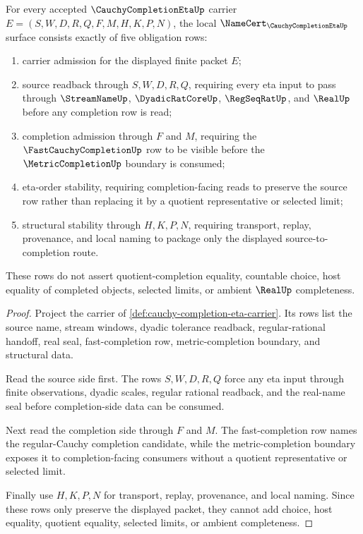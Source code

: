\begin{theorem}
\label{thm:cauchy-completion-eta-namecert-obligations}
For every accepted $\CauchyCompletionEtaUp$ carrier $E=(S,W,D,R,Q,F,M,H,K,P,N)$, the local $\NameCert_{\CauchyCompletionEtaUp}$ surface consists exactly of five obligation rows:
\begin{enumerate}
\item carrier admission for the displayed finite packet $E$;
\item source readback through $S,W,D,R,Q$, requiring every eta input to pass through $\StreamNameUp$, $\DyadicRatCoreUp$, $\RegSeqRatUp$, and $\RealUp$ before any completion row is read;
\item completion admission through $F$ and $M$, requiring the $\FastCauchyCompletionUp$ row to be visible before the $\MetricCompletionUp$ boundary is consumed;
\item eta-order stability, requiring completion-facing reads to preserve the source row rather than replacing it by a quotient representative or selected limit;
\item structural stability through $H,K,P,N$, requiring transport, replay, provenance, and local naming to package only the displayed source-to-completion route.
\end{enumerate}
These rows do not assert quotient-completion equality, countable choice, host equality of completed objects, selected limits, or ambient $\RealUp$ completeness.
\end{theorem}
\begin{proof}
Project the carrier of \autoref{def:cauchy-completion-eta-carrier}. Its rows list the source name, stream windows, dyadic tolerance readback, regular-rational handoff, real seal, fast-completion row, metric-completion boundary, and structural data.

Read the source side first. The rows $S,W,D,R,Q$ force any eta input through finite observations, dyadic scales, regular rational readback, and the real-name seal before completion-side data can be consumed.

Next read the completion side through $F$ and $M$. The fast-completion row names the regular-Cauchy completion candidate, while the metric-completion boundary exposes it to completion-facing consumers without a quotient representative or selected limit.

Finally use $H,K,P,N$ for transport, replay, provenance, and local naming. Since these rows only preserve the displayed packet, they cannot add choice, host equality, quotient equality, selected limits, or ambient completeness.
\end{proof}

